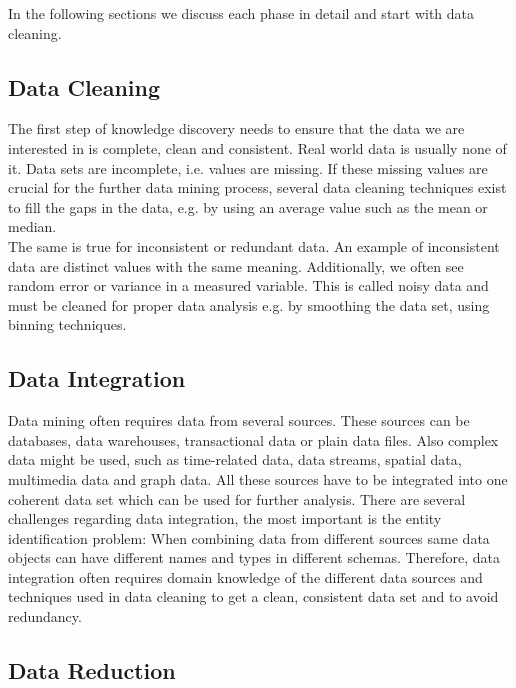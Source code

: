 In the following sections we discuss each phase in detail and start with data cleaning. 

\subsection{Data Cleaning} 
The first step of knowledge discovery needs to ensure that the data we are interested in is complete, clean and consistent. Real world data is usually none of it. Data sets are incomplete, i.e. values are missing. If these missing values are crucial for the further data mining process, several data cleaning techniques exist to fill the gaps in the data, e.g. by using an average value such as the mean or median.
\\
The same is true for inconsistent or redundant data. An example of inconsistent data are distinct values with the same meaning. Additionally, we often see random error or variance in a measured variable. This is called noisy data and must be cleaned for proper data analysis e.g. by smoothing the data set, using binning techniques.


\subsection{Data Integration}

Data mining often requires data from several sources. These sources can be databases, data warehouses, transactional data or plain data files. Also complex data might be used, such as time-related data, data streams, spatial data, multimedia data and graph data. All these sources have to be integrated into one coherent data set which can be used for further analysis. There are several challenges regarding data integration, the most important is the entity identification problem: When combining data from different sources same data objects can have different names and types in different schemas. Therefore, data integration often requires domain knowledge of the different data sources and techniques used in data cleaning to get a clean, consistent data set and to avoid redundancy.


\subsection{Data Reduction}

